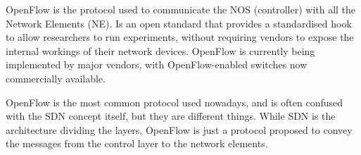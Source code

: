 OpenFlow is the protocol used to communicate the NOS (controller) with all the Network Elements (NE). Is an open standard that provides a standardised hook to allow researchers to run experiments, without requiring vendors to expose the internal workings of their network devices. OpenFlow is currently being implemented by major vendors, with OpenFlow-enabled switches now commercially available.

OpenFlow is the most common protocol used nowadays, and is often confused with the SDN concept itself, but they are different things. While SDN is the architecture dividing the layers, OpenFlow is just a protocol proposed to convey the messages from the control layer to the network elements.